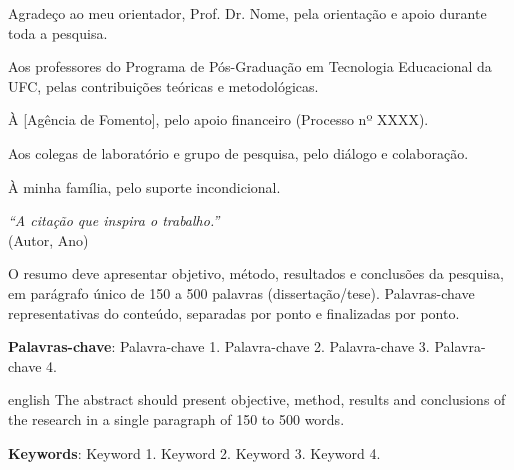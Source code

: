 \documentclass[
  12pt,
  openright,
  twoside,
  a4paper,
  brazilian
]{abntex2}
\begin{document}
\begin{agradecimentos}
Agradeço ao meu orientador, Prof. Dr. Nome, pela orientação e apoio durante
toda a pesquisa.

Aos professores do Programa de Pós-Graduação em Tecnologia Educacional da UFC,
pelas contribuições teóricas e metodológicas.

À [Agência de Fomento], pelo apoio financeiro (Processo nº XXXX).

Aos colegas de laboratório e grupo de pesquisa, pelo diálogo e colaboração.

À minha família, pelo suporte incondicional.
\end{agradecimentos}

\begin{epigrafe}
  \vspace*{\fill}
  \begin{flushright}
    \textit{``A citação que inspira o trabalho.''} \\
    (Autor, Ano)
  \end{flushright}
  \vspace*{\fill}
\end{epigrafe}

\setlength{\absparsep}{18pt}
\begin{resumo}
O resumo deve apresentar objetivo, método, resultados e conclusões da
pesquisa, em parágrafo único de 150 a 500 palavras (dissertação/tese).
Palavras-chave representativas do conteúdo, separadas por ponto e finalizadas
por ponto.
\vspace{\onelineskip}

\noindent
\textbf{Palavras-chave}: Palavra-chave 1. Palavra-chave 2. Palavra-chave 3.
Palavra-chave 4.
\end{resumo}

\begin{resumo}[Abstract]
  \begin{otherlanguage*}{english}
  The abstract should present objective, method, results and conclusions of
  the research in a single paragraph of 150 to 500 words.
  \vspace{\onelineskip}

  \noindent
  \textbf{Keywords}: Keyword 1. Keyword 2. Keyword 3. Keyword 4.
  \end{otherlanguage*}
\end{resumo}

\end{document}
